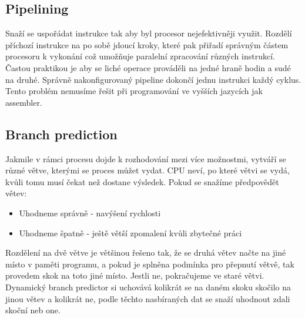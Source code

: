 \subsection{Pipelining}
Snaží se uspořádat instrukce tak aby byl procesor nejefektivněji využit.
Rozdělí příchozí instrukce na po sobě jdoucí kroky, které pak přiřadí správným částem procesoru k vykonání což umožňuje paralelní zpracování různých instrukcí.
Častou praktikou je aby se liché operace prováděli na jedné hraně hodin a sudé na druhé.
Správně nakonfigurovaný pipeline dokončí jednu instrukci každý cyklus.
Tento problém nemusíme řešit při programování ve vyšších jazycích jak assembler.
\subsection{Branch prediction}
Jakmile v rámci procesu dojde k rozhodování mezi více možnostmi, vytváří se různé větve, kterými se proces můžet vydat.
CPU neví, po které větvi se vydá, kvůli tomu musí čekat než dostane výsledek.
Pokud se snažíme předpovědět větev:
\begin{itemize}
  \item Uhodneme správně - navýšení rychlosti
  \item Uhodneme špatně - ještě větší zpomalení kvůli zbytečné práci
\end{itemize}
Rozdělení na dvě větve je většinou řešeno tak, že se druhá větev načte na jiné místo v paměti programu, a pokud je splněna podmínka pro přepnutí větvě, tak provedem skok na toto jiné místo.
Jestli ne, pokračujeme ve staré větvi.
Dynamický branch predictor si uchovává kolikrát se na daném skoku skočilo na jinou větev a kolikrát ne, podle těchto nasbíraných dat se snaží uhodnout zdali skoční neb one.